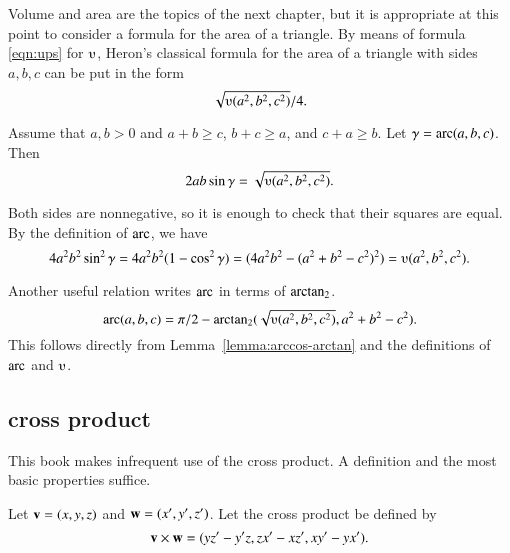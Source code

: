 %
Volume and area are the topics of the next chapter, but it
is appropriate at this point to consider a formula for the area of a
triangle.  By means of formula \eqref{eqn:ups} for $\ups$, Heron's classical formula
for the area of a triangle with sides $a,b,c$ can be put in the form
\[ \sqrt{\ups(a^2,b^2,c^2)}/4.\] 

\begin{lemma}\label{lemma:los}
Assume that $a,b>0$ and $a+b\ge c$, $b+c\ge a$, and $c+a\ge b$.
Let $\gamma=\operatorname{arc}(a,b,c)$.  Then
\[ 2 a b \sin\gamma =
  \sqrt{\ups(a^2,b^2,c^2)}.\] 
\end{lemma}
%
%
%
\begin{proved}
  Both sides are nonnegative, so it is
  enough to check that their squares are equal.  By the definition of
  $\operatorname{arc}$, we have
\[ 
4 a^2 b^2 \sin^2\gamma 
= 4 a^2 b^2 (1-\cos^2\gamma) 
= (4 a^2 b^2 - (a^2 + b^2 -
c^2)^2) 
= \ups(a^2,b^2,c^2).\] 
\swallowed\end{proved}

Another useful relation writes $\operatorname{arc}$ in terms of ${\operatorname{arctan_2}}$.
\begin{equation}\label{eqn:arc-atn}
\arc(a,b,c) = 
\pi/2 - \atn({\sqrt{\ups(a^2,b^2,c^2)}},{ a^2 + b^2 - c^2}).
\end{equation}
This follows directly from Lemma~\ref{lemma:arccos-arctan} and the
definitions of $\operatorname{arc}$ and
  $\ups$.



\subsection{cross product} \label{sec:cross}

This book makes infrequent use of the cross product.
A definition and the most basic properties  suffice.

\begin{definition}\label{def:cross}
Let ${\mathbf v} =(x,y,z)$ and ${\mathbf w} = (x',y',z')$.  
Let the cross product be defined
by
\[ 
{\mathbf v} \times {\mathbf w} = (y z' - y' z, z x' - x z', x y' - y x').
\] 
%
%
%
\end{definition}

